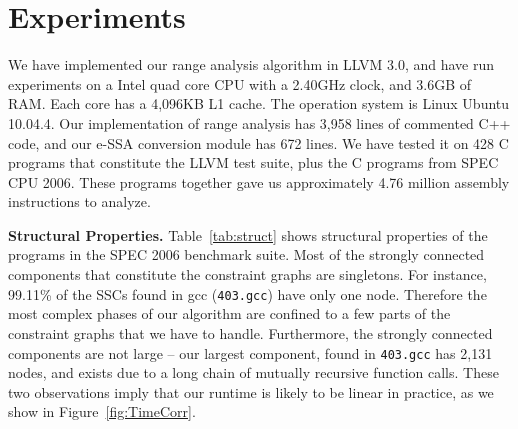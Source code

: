 \documentclass{llncs}
\begin{document}
%

\section{Experiments}
\label{sec:exp}

We have implemented our range analysis algorithm in LLVM 3.0, and have run
experiments on a Intel quad core CPU with a 2.40GHz clock, and 3.6GB of RAM.
Each core has a 4,096KB L1 cache.
The operation system is Linux Ubuntu 10.04.4.
Our implementation of range analysis has 3,958 lines of
commented C++ code, and our e-SSA conversion module has 672 lines.
We have tested it on 428 C programs that constitute the LLVM test suite, plus
the C programs from SPEC CPU 2006.
These programs together gave us approximately 4.76 million assembly
instructions to analyze.

\noindent
\textbf{Structural Properties.}
Table~\ref{tab:struct} shows structural properties of the programs in
the SPEC 2006 benchmark suite.
Most of the strongly connected components that constitute
the constraint graphs are singletons.
For instance, 99.11\% of the SSCs found in gcc (\texttt{403.gcc}) have only
one node.
Therefore the most complex phases of our algorithm are
confined to a few parts of the constraint graphs that we have to handle.
Furthermore, the strongly connected components are not large -- our largest
component, found in \texttt{403.gcc} has 2,131 nodes, and exists due to a long
chain of mutually recursive function calls.
These two observations imply that our runtime is likely to be linear in
practice, as we show in Figure~\ref{fig:TimeCorr}.
\end{document}
